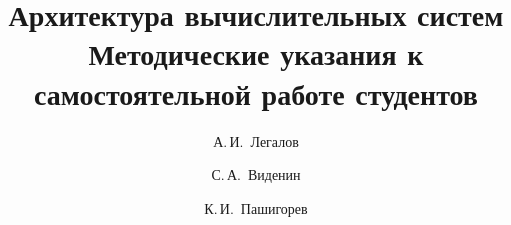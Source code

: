 \documentclass [a4paper, 12pt, oneside]{scrbook}
\begin{document}
\renewcommand\figurename{Рисунок}


\title{\Huge{Архитектура вычислительных систем\\ \large{Методические указания к самостоятельной работе студентов}}}

\author {{\Large{А.\,И.~Легалов}}
    \and {\Large{С.\,А.~Виденин}}
    \and {\Large{К.\,И.~Пашигорев}}}

\maketitle


\tableofcontents



%





\end{document}
